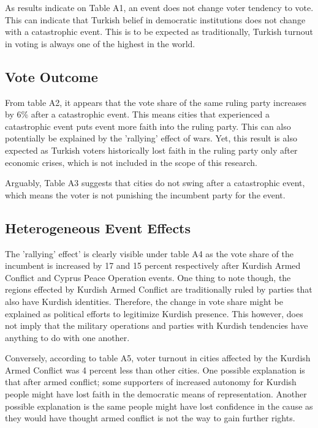\documentclass[12pt]{article}
\begin{document}
As results indicate on Table A1, an event does not change voter tendency to vote. This can indicate that Turkish belief in democratic institutions does not change with a catastrophic event. This is to be expected as traditionally, Turkish turnout in voting is always one of the highest in the world.

\subsection{Vote Outcome}

From table A2, it appears that the vote share of the same ruling party increases by 6\% after a catastrophic event. This means cities that experienced a catastrophic event puts event more faith into the ruling party. This can also potentially be explained by the 'rallying' effect of wars. Yet, this result is also expected as Turkish voters historically lost faith in the ruling party only after economic crises, which is not included in the scope of this research. 

Arguably, Table A3 suggests that cities do not swing after a catastrophic event, which means the voter is not punishing the incumbent party for the event. 


\subsection{Heterogeneous Event Effects}

The 'rallying' effect' is clearly visible under table A4 as the vote share of the incumbent is increased by 17 and 15 percent respectively after Kurdish Armed Conflict and Cyprus Peace Operation events. 
One thing to note though, the regions effected by Kurdish Armed Conflict are traditionally ruled by parties that also have Kurdish identities. Therefore, the change in vote share might be explained as political efforts to legitimize Kurdish presence. This however, does not imply that the military operations and parties with Kurdish tendencies have anything to do with one another.  

Conversely, according to table A5, voter turnout in cities affected by the Kurdish Armed Conflict was 4 percent less than other cities. One possible explanation is that after armed conflict; some supporters of increased autonomy for Kurdish people might have lost faith in the democratic means of representation. Another possible explanation is the same people might have lost confidence in the cause as they would have thought armed conflict is not the way to gain further rights.
\end{document}
